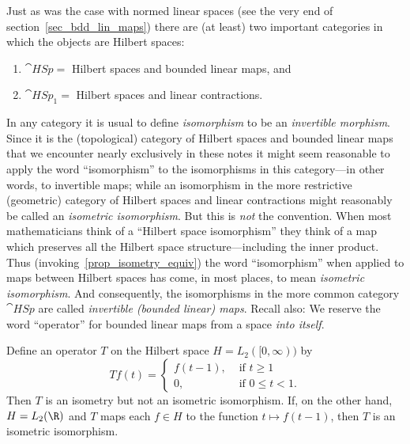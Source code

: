 Just as was the case with normed linear spaces (see the very end of section~\ref{sec_bdd_lin_maps})
there are (at least) two important categories in which the objects are Hilbert spaces:
 \begin{enumerate}
  \item[(a)] $\cat{HSp} =$ Hilbert spaces and bounded linear maps, and
  \item[(b)] $\cat{HSp_1} =$ Hilbert spaces and linear contractions.
 \end{enumerate}
In any category it is usual to define \emph{isomorphism} to be an \emph{invertible morphism}. Since it is the
(topological) category of Hilbert spaces and bounded linear maps that we encounter
nearly exclusively in these notes it might seem reasonable to apply the word ``isomorphism'' to
the isomorphisms in this category---in other words, to invertible maps; while an isomorphism
in the more restrictive
(geometric) category of Hilbert spaces and linear contractions might reasonably be
called an \emph{isometric isomorphism}.  But this is \emph{not} the convention.  When most mathematicians think of
a ``Hilbert space isomorphism'' they think of a map which preserves all the Hilbert space structure---including
the inner product.  Thus (invoking~\ref{prop_isometry_equiv}) the word
``isomorphism'' when applied to maps between Hilbert spaces has come, in most places, to mean \emph{isometric isomorphism}.
And consequently, the isomorphisms in the more common category $\cat{HSp}$ are called \emph{invertible (bounded linear) maps}.
Recall also: We reserve the word
``operator'' for bounded linear maps from a space \emph{into itself}.

\begin{exam} Define an operator $T$ on the Hilbert space $H = L_2([0,\infty))$ by
   \[ Tf(t) = \begin{cases}   f(t-1),  &\text{ if $t \ge 1$} \\
                                   0,  &\text{ if $0 \le t < 1$.}
           \end{cases} \]
Then $T$ is an isometry but not an isometric isomorphism. If, on the other hand,
$H = L_2(\R)$ and $T$ maps each $f \in H$ to the function $t \mapsto f(t-1)$, then $T$ is an isometric isomorphism.
\end{exam}

